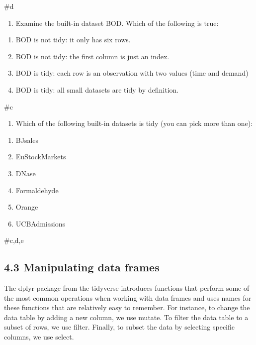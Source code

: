 \documentclass[
]{article}
\providecommand{\tightlist}{%
  \setlength{\itemsep}{0pt}\setlength{\parskip}{0pt}}
\begin{document}
\#d

\begin{enumerate}
\def\labelenumi{\arabic{enumi}.}
\setcounter{enumi}{2}
\tightlist
\item
  Examine the built-in dataset BOD. Which of the following is true:
\end{enumerate}

\begin{enumerate}
\def\labelenumi{\alph{enumi}.}
\tightlist
\item
  BOD is not tidy: it only has six rows.
\item
  BOD is not tidy: the first column is just an index.
\item
  BOD is tidy: each row is an observation with two values (time and
  demand)
\item
  BOD is tidy: all small datasets are tidy by definition.
\end{enumerate}

\#c

\begin{enumerate}
\def\labelenumi{\arabic{enumi}.}
\setcounter{enumi}{3}
\tightlist
\item
  Which of the following built-in datasets is tidy (you can pick more
  than one):
\end{enumerate}

\begin{enumerate}
\def\labelenumi{\alph{enumi}.}
\tightlist
\item
  BJsales
\item
  EuStockMarkets
\item
  DNase
\item
  Formaldehyde
\item
  Orange
\item
  UCBAdmissions
\end{enumerate}

\#c,d,e

\hypertarget{manipulating-data-frames}{%
\subsection{4.3 Manipulating data
frames}\label{manipulating-data-frames}}

The dplyr package from the tidyverse introduces functions that perform
some of the most common operations when working with data frames and
uses names for these functions that are relatively easy to remember. For
instance, to change the data table by adding a new column, we use
mutate. To filter the data table to a subset of rows, we use filter.
Finally, to subset the data by selecting specific columns, we use
select.
\end{document}
